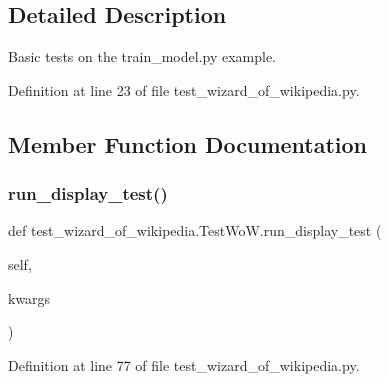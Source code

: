 \subsection{Detailed Description}
\begin{DoxyVerb}Basic tests on the train_model.py example.
\end{DoxyVerb}
 

Definition at line 23 of file test\+\_\+wizard\+\_\+of\+\_\+wikipedia.\+py.



\subsection{Member Function Documentation}
\mbox{\label{classtest__wizard__of__wikipedia_1_1TestWoW_a8817f78f5eb9d33489bc79c305d174cc}} 
\subsubsection{\texorpdfstring{run\+\_\+display\+\_\+test()}{run\_display\_test()}}
{\footnotesize\ttfamily def test\+\_\+wizard\+\_\+of\+\_\+wikipedia.\+Test\+Wo\+W.\+run\+\_\+display\+\_\+test (\begin{DoxyParamCaption}\item[{}]{self,  }\item[{}]{kwargs }\end{DoxyParamCaption})}



Definition at line 77 of file test\+\_\+wizard\+\_\+of\+\_\+wikipedia.\+py.


